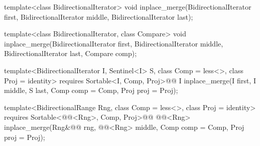 %
\begin{removedblock}
\begin{itemdecl}
template<class BidirectionalIterator>
  void inplace_merge(BidirectionalIterator first,
                     BidirectionalIterator middle,
                     BidirectionalIterator last);

template<class BidirectionalIterator, class Compare>
  void inplace_merge(BidirectionalIterator first,
                     BidirectionalIterator middle,
                     BidirectionalIterator last, Compare comp);
\end{itemdecl}
\end{removedblock}
\begin{addedblock}
\begin{itemdecl}
template<BidirectionalIterator I, Sentinel<I> S, class Comp = less<>,
    class Proj = identity>
  requires Sortable<I, Comp, Proj>@\newtxt{()}@
  I
    inplace_merge(I first, I middle, S last, Comp comp = Comp{}, Proj proj = Proj{});

template<BidirectionalRange Rng, class Comp = less<>, class Proj = identity>
  requires Sortable<@@<Rng>, Comp, Proj>@\newtxt{()}@
  @@<Rng>
    inplace_merge(Rng&@\newtxt{\&}@ rng, @@<Rng> middle, Comp comp = Comp{},
                  Proj proj = Proj{});
\end{itemdecl}
\end{addedblock}

